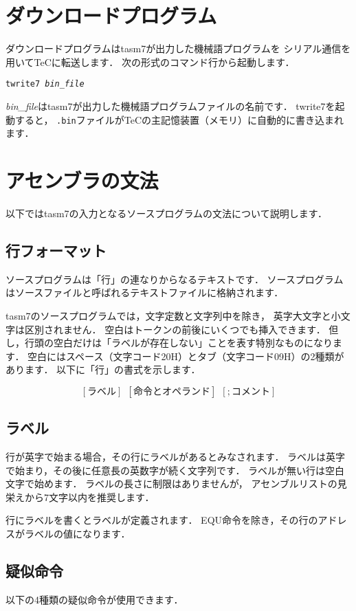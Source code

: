 \section{ダウンロードプログラム}
ダウンロードプログラムはtasm7が出力した機械語プログラムを
シリアル通信を用いてTeCに転送します．
次の形式のコマンド行から起動します．

\begin{center}
{\small\tt twrite7  {\it bin\_file}} \\
\end{center}

{\it bin\_file}はtasm7が出力した機械語プログラムファイルの名前です．
twrite7を起動すると，
{\tt .bin}ファイルがTeCの主記憶装置（メモリ）に自動的に書き込まれます．

\section{アセンブラの文法}
\label{syn}
以下ではtasm7の入力となるソースプログラムの文法について説明します．

\subsection{行フォーマット}
ソースプログラムは「行」の連なりからなるテキストです．
ソースプログラムはソースファイルと呼ばれるテキストファイルに格納されます．

tasm7のソースプログラムでは，文字定数と文字列中を除き，
英字大文字と小文字は区別されません．
空白はトークンの前後にいくつでも挿入できます．
但し，行頭の空白だけは「ラベルが存在しない」ことを表す特別なものになります．
空白にはスペース（文字コード20H）とタブ（文字コード09H）の2種類があります．
以下に「行」の書式を示します．

{\small\[ [ラベル]~~[命令とオペランド]~~[ ; コメント] \]}

\subsection{ラベル}
行が英字で始まる場合，その行にラベルがあるとみなされます．
ラベルは英字で始まり，その後に任意長の英数字が続く文字列です．
ラベルが無い行は空白文字で始めます．
ラベルの長さに制限はありませんが，
アセンブルリストの見栄えから7文字以内を推奨します．

行にラベルを書くとラベルが定義されます．
EQU命令を除き，その行のアドレスがラベルの値になります．

\subsection{疑似命令}
以下の4種類の疑似命令が使用できます．

